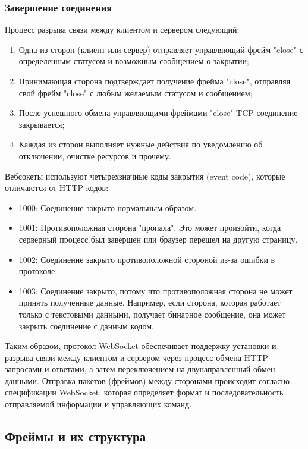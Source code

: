 \subsubsection{Завершение соединения}

Процесс разрыва связи между клиентом и сервером следующий:

\begin{enumerate}
\item Одна из сторон (клиент или сервер) отправляет управляющий фрейм "close" с определенным статусом и возможным сообщением о закрытии;
\item Принимающая сторона подтверждает получение фрейма "close", отправляя свой фрейм "close" с любым желаемым статусом и сообщением;
\item После успешного обмена управляющими фреймами "close" TCP-соединение закрывается;
\item Каждая из сторон выполняет нужные действия по уведомлению об отключении, очистке ресурсов и прочему.
\end{enumerate}

Вебсокеты используют четырехзначные коды закрытия (event code), которые отличаются от HTTP-кодов:
\begin{itemize}
\item 1000: Соединение закрыто нормальным образом.
\item 1001: Противоположная сторона "пропала". Это может произойти, когда серверный процесс был завершен или браузер перешел на другую страницу.
\item 1002: Соединение закрыто противоположной стороной из-за ошибки в протоколе.
\item 1003: Соединение закрыто, потому что противоположная сторона не может принять полученные данные. Например, если сторона, которая работает только с текстовыми данными, получает бинарное сообщение, она может закрыть соединение с данным кодом.
\end{itemize}

Таким образом, протокол WebSocket обеспечивает поддержку установки и разрыва связи между клиентом и сервером через процесс обмена HTTP-запросами и ответами, а затем переключением на двунаправленный обмен данными. Отправка пакетов (фреймов) между сторонами происходит согласно спецификации WebSocket, которая определяет формат и последовательность отправляемой информации и управляющих команд.

\subsection{Фреймы и их структура}

